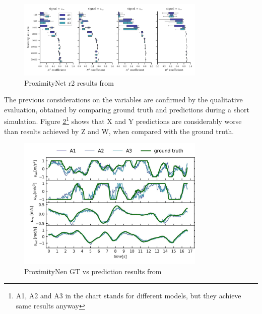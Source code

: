\begin{figure}[!htb]
	\centering
	\includegraphics[width=0.8\textwidth]{"contents/images/03-proximitynet-r2"}
	\caption[ProximityNet \gls{r2} results from \cite{mantegazza2019visionbased}]{ProximityNet \gls{r2} results from \cite{mantegazza2019visionbased}}
	\label{fig:proximitynet-r2}
\end{figure}

\medskip

The previous considerations on the variables are confirmed by the qualitative evaluation, obtained by comparing ground truth and predictions during a short simulation. Figure \ref{fig:proximitynet-gt-pred}\footnote{A1, A2 and A3 in the chart stands for different models, but they achieve same results anyway} shows that X and Y predictions are considerably worse than results achieved by Z and W, when compared with the ground truth.

\begin{figure}[!htb]
	\centering
	\includegraphics[width=0.8\textwidth]{"contents/images/03-proximitynet-gt-pred-2"}
	\caption[ProximityNet GT vs prediction results from \cite{mantegazza2019visionbased}]{ProximityNen GT vs prediction results from \cite{mantegazza2019visionbased}}
	\label{fig:proximitynet-gt-pred}
\end{figure}



